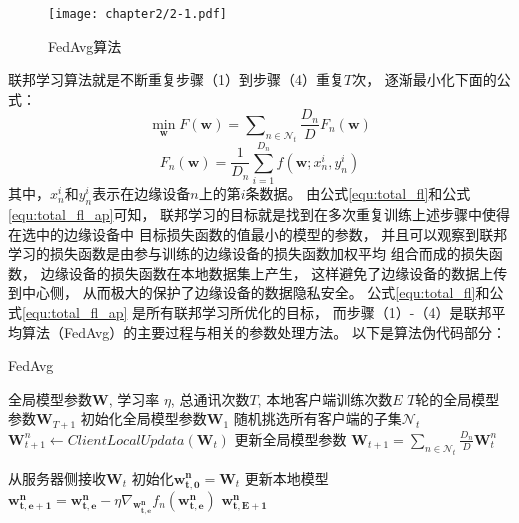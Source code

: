 \begin{figure}[H]
    \centering
    \texttt{[image: chapter2/2-1.pdf]}
    \caption{\label{fig:2-1}FedAvg算法}
\end{figure}

联邦学习算法就是不断重复步骤（1）到步骤（4）重复$T$次，
逐渐最小化下面的公式：
\begin{equation}
    \label{equ:total_fl}
    \underset{\mathbf{w}}{\min} F(\mathbf{w}) = 
    \sum\nolimits_{n \in \mathcal{N}_t} \frac{D_n}{D} F_{n}(\mathbf{w})
\end{equation}
\begin{equation}    
    \label{equ:total_fl_ap}
    F_{n}(\mathbf{w}) = 
    \frac{1}{D_n}\sum_{i=1}^{D_n} f(\mathbf{w};x_n^i,y_n^i)
\end{equation}
其中，$x_n^i$和$y_n^i$表示在边缘设备$n$上的第$i$条数据。
由公式\ref{equ:total_fl}和公式\ref{equ:total_fl_ap}可知，
联邦学习的目标就是找到在多次重复训练上述步骤中使得在选中的边缘设备中
目标损失函数的值最小的模型的参数，
并且可以观察到联邦学习的损失函数是由参与训练的边缘设备的损失函数加权平均
组合而成的损失函数，
边缘设备的损失函数在本地数据集上产生，
这样避免了边缘设备的数据上传到中心侧，
从而极大的保护了边缘设备的数据隐私安全。
公式\ref{equ:total_fl}和公式\ref{equ:total_fl_ap}
是所有联邦学习所优化的目标，
而步骤（1）-（4）是联邦平均算法（FedAvg）的主要过程与相关的参数处理方法。
以下是算法伪代码部分：
\begin{algorithm}[H]
    \caption{FedAvg}\label{alg:fedavg}
    \begin{algorithmic}[1]
    \Require 全局模型参数$\mathbf{W}$,
                学习率 $\eta$,
                总通讯次数$T$,
                本地客户端训练次数$E$
    \Ensure $T$轮的全局模型参数$\mathbf{W}_{T+1}$
    \State 初始化全局模型参数$\mathbf{W}_1$
      {}
            \State 随机挑选所有客户端的子集$\mathcal{N}_t$
                \State $\mathbf{W}_{t+1}^n \leftarrow ClientLocalUpdata(\mathbf{W}_t)$
            \EndFor
            \State 更新全局模型参数
            $\mathbf{W}_{t+1} =
            \sum\nolimits_{n \in \mathcal{N}_t}\frac{D_n}{D}\mathbf{W}_t^n$
        \EndFor
    \EndProcedure

        \State 从服务器侧接收$\mathbf{W}_t$
        \State 初始化$\mathbf{w^n_{t,0}} = \mathbf{W}_t$
            \State 更新本地模型
            $\mathbf{w^n_{t,e+1}} = \mathbf{w^n_{t,e}} - \eta \nabla_{\mathbf{w^n_{t,e}}} f_n(\mathbf{w^n_{t,e}})$
        \EndFor
        \State \Return $\mathbf{w^n_{t,E+1}}$
    \EndProcedure
\end{algorithmic}
\end{algorithm}
